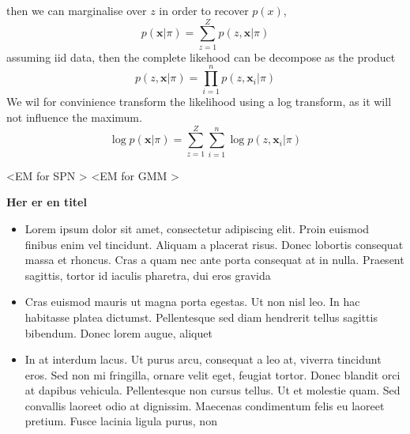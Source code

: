then we can marginalise over
    $z$ in order to recover $p(x)$, 
    $$p(\textbf{x}|\pi) = \sum_{z=1}^Z p(z,\textbf{x}|\pi) $$
    assuming iid data, then the complete likehood can be decompose as the product 
    $$ p(z,\textbf{x}|\pi) = \prod_{i=1}^n p(z,\textbf{x}_i|\pi)$$
    We wil for convinience transform the likelihood using a log transform, 
    as it will not influence the maximum. 
    $$\log p(\textbf{x}|\pi) = \sum_{z=1}^Z \sum_{i=1}^n \log p(z,\textbf{x}_i|\pi)$$

<EM for SPN >
<EM for GMM >



\begin{tcolorbox}[
    sharp corners,
    boxrule=0mm,
    enhanced,
    borderline west={2pt}{0pt}{red},
    colframe=drGray,
    colback=drGray,
    coltitle=black,
]
{\large \textbf{Her er en titel}}
\begin{itemize}
    \item Lorem ipsum dolor sit amet, consectetur adipiscing elit. Proin euismod finibus enim vel tincidunt. Aliquam a placerat risus. Donec lobortis consequat massa et rhoncus. Cras a quam nec ante porta consequat at in nulla. Praesent sagittis, tortor id iaculis pharetra, dui eros gravida 

\item Cras euismod mauris ut magna porta egestas. Ut non nisl leo. In hac habitasse platea dictumst. Pellentesque sed diam hendrerit tellus sagittis bibendum. Donec lorem augue, aliquet 

 \item In at interdum lacus. Ut purus arcu, consequat a leo at, viverra tincidunt eros. Sed non mi fringilla, ornare velit eget, feugiat tortor. Donec blandit orci at dapibus vehicula. Pellentesque non cursus tellus. Ut et molestie quam. Sed convallis laoreet odio at dignissim. Maecenas condimentum felis eu laoreet pretium. Fusce lacinia ligula purus, non
\end{itemize}
\end{tcolorbox}

